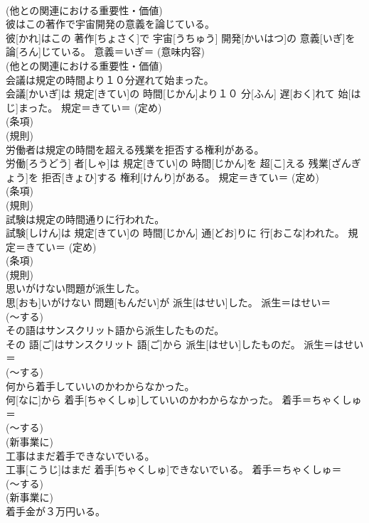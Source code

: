 \documentclass[8pt]{extreport}
\begin{document}
\begin{CJK}{UTF8}{min}
{\\	(他との関連における重要性・価値) 
\\	彼はこの著作で宇宙開発の意義を論じている。	
\\	彼[かれ]はこの 著作[ちょさく]で 宇宙[うちゅう] 開発[かいはつ]の 意義[いぎ]を 論[ろん]じている。	意義＝いぎ＝ (意味内容) 
\\	(他との関連における重要性・価値) 
\\	会議は規定の時間より１０分遅れて始まった。	
\\	会議[かいぎ]は 規定[きてい]の 時間[じかん]より１０ 分[ふん] 遅[おく]れて 始[はじ]まった。	規定＝きてい＝ (定め) 
\\	(条項) 
\\	(規則) 
\\	労働者は規定の時間を超える残業を拒否する権利がある。	
\\	労働[ろうどう] 者[しゃ]は 規定[きてい]の 時間[じかん]を 超[こ]える 残業[ざんぎょう]を 拒否[きょひ]する 権利[けんり]がある。	規定＝きてい＝ (定め) 
\\	(条項) 
\\	(規則) 
\\	試験は規定の時間通りに行われた。	
\\	試験[しけん]は 規定[きてい]の 時間[じかん] 通[どお]りに 行[おこな]われた。	規定＝きてい＝ (定め) 
\\	(条項) 
\\	(規則) 
\\	思いがけない問題が派生した。	
\\	思[おも]いがけない 問題[もんだい]が 派生[はせい]した。	派生＝はせい＝ 
\\	(〜する) 
\\	その語はサンスクリット語から派生したものだ。	
\\	その 語[ご]はサンスクリット 語[ご]から 派生[はせい]したものだ。	派生＝はせい＝ 
\\	(〜する) 
\\	何から着手していいのかわからなかった。	
\\	何[なに]から 着手[ちゃくしゅ]していいのかわからなかった。	着手＝ちゃくしゅ＝ 
\\	(〜する) 
\\	(新事業に) 
\\	工事はまだ着手できないでいる。	
\\	工事[こうじ]はまだ 着手[ちゃくしゅ]できないでいる。	着手＝ちゃくしゅ＝ 
\\	(〜する) 
\\	(新事業に) 
\\	着手金が３万円いる。	
}
\end{CJK}
\end{document}

